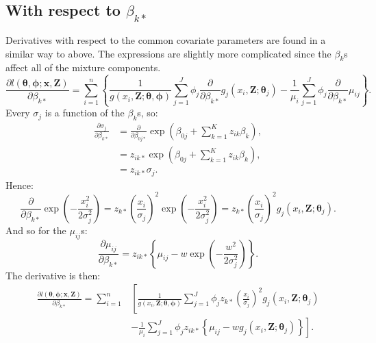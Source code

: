 \subsection{With respect to $\beta_{k*}$}

Derivatives with respect to the common covariate parameters are found in a similar way to above. The expressions are slightly more complicated since the $\beta_k$s affect all of the mixture components.
\begin{equation*}
\frac{\partial l(\bm{\theta},\bm{\phi}; \mathbf{x},\mathbf{Z})}{\partial \beta_{k*}} = \sum_{i=1}^n \left \{ \frac{1}{g(x_i,\mathbf{Z}; \bm{\theta},\bm{\phi})} \sum_{j=1}^J \phi_j \frac{\partial}{\partial \beta_{k*}} g_j(x_i,\mathbf{Z}; \bm{\theta}_j) - \frac{1}{\mu_i} \sum_{j=1}^J \phi_j \frac{\partial}{\partial \beta_{k*}}\mu_{ij}\right \}.
\end{equation*}
Every $\sigma_{j}$ is a function of the $\beta_{k}$s, so:
\begin{align*}
\frac{\partial \sigma_{j}}{\partial \beta_{k*}} &= \frac{\partial}{\partial \beta_{0j*}} \exp \left ( \beta_{0j} + \sum_{k=1}^K z_{ik} \beta_{k}\right ),\\
&= z_{ik*} \exp \left ( \beta_{0j} + \sum_{k=1}^K z_{ik} \beta_{k}\right ),\\
&= z_{ik*}\sigma_{j}.
\end{align*}
Hence:
\begin{equation*}
 \frac{\partial}{\partial \beta_{k*}} \exp\left ( -\frac{x_i^2}{2\sigma_{j}^2} \right ) = z_{k*} \left ( \frac{x_i}{\sigma_{j}}\right )^2 \exp \left (-\frac{x_i^2}{2 \sigma_{j}^2}\right ) = z_{k*} \left ( \frac{x_i}{\sigma_{j}}\right )^2 g_j(x_i,\mathbf{Z}; \bm{\theta}_j).
 \label{detfct-deriv-k}
\end{equation*}
And so for the $\mu_{ij}$s:
\begin{equation*}
\frac{\partial \mu_{ij}}{\partial \beta_{k*}} = z_{ik*} \left \{ \mu_{ij} - w \exp\left ( -\frac{w^2}{2\sigma_{j}^2} \right ) \right \}.
\end{equation*}
The derivative is then:
\begin{align*}
\frac{\partial l(\bm{\theta},\bm{\phi}; \mathbf{x},\mathbf{Z})}{\partial \beta_{k*}} = \sum_{i=1}^n & \left [ \frac{1}{g(x_i,\mathbf{Z}; \bm{\theta},\bm{\phi})} \sum_{j=1}^J \phi_j  z_{k*} \left ( \frac{x_i}{\sigma_{j}}\right )^2 g_j(x_i,\mathbf{Z}; \bm{\theta}_j) \right. \\
& - \left. \frac{1}{\mu_i} \sum_{j=1}^J \phi_j z_{ik*} \left \{ \mu_{ij} - w g_j(x_i,\mathbf{Z}; \bm{\theta}_j) \right \} \right ].
\end{align*}

